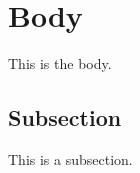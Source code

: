 \section{Body}\label{body}
This is the body.
\subsection{Subsection}\label{subsection}
This is a subsection.
